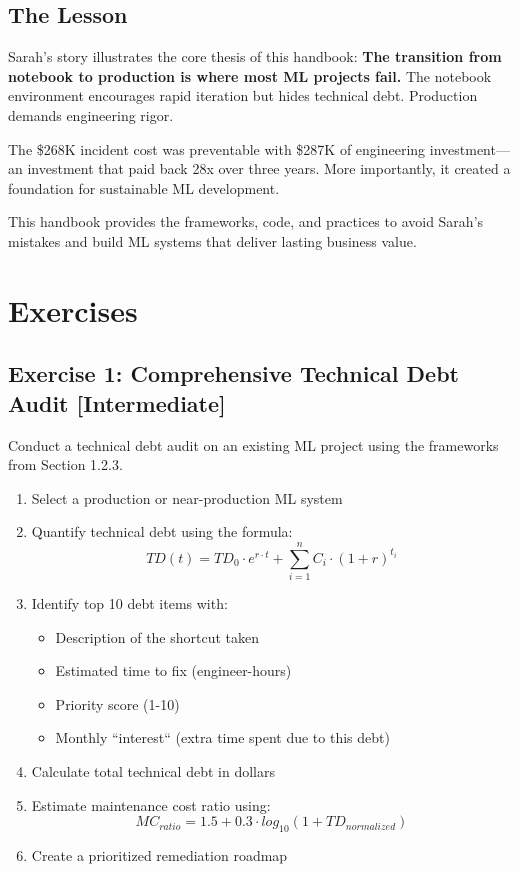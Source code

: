 \subsection{The Lesson}

Sarah's story illustrates the core thesis of this handbook: \textbf{The transition from notebook to production is where most ML projects fail.} The notebook environment encourages rapid iteration but hides technical debt. Production demands engineering rigor.

The \$268K incident cost was preventable with \$287K of engineering investment---an investment that paid back 28x over three years. More importantly, it created a foundation for sustainable ML development.

This handbook provides the frameworks, code, and practices to avoid Sarah's mistakes and build ML systems that deliver lasting business value.

\section{Exercises}

\subsection{Exercise 1: Comprehensive Technical Debt Audit [Intermediate]}

Conduct a technical debt audit on an existing ML project using the frameworks from Section 1.2.3.

\begin{enumerate}
    \item Select a production or near-production ML system
    \item Quantify technical debt using the formula:
        \begin{equation*}
        TD(t) = TD_0 \cdot e^{r \cdot t} + \sum_{i=1}^{n} C_i \cdot (1 + r)^{t_i}
        \end{equation*}
    \item Identify top 10 debt items with:
        \begin{itemize}
            \item Description of the shortcut taken
            \item Estimated time to fix (engineer-hours)
            \item Priority score (1-10)
            \item Monthly ``interest`` (extra time spent due to this debt)
        \end{itemize}
    \item Calculate total technical debt in dollars
    \item Estimate maintenance cost ratio using:
        \begin{equation*}
        MC_{ratio} = 1.5 + 0.3 \cdot log_{10}(1 + TD_{normalized})
        \end{equation*}
    \item Create a prioritized remediation roadmap
\end{enumerate}


